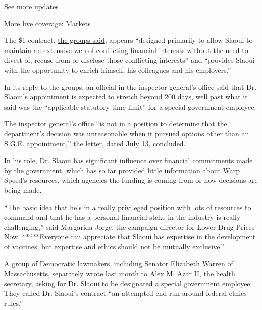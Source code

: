 \href{https://www.nytimes.com/2020/08/01/world/coronavirus-covid-19.html?action=click\&pgtype=Article\&state=default\&region=MAIN_CONTENT_1\&context=storylines_live_updates}{See
more updates}

More live coverage:
\href{https://www.nytimes.com/live/2020/07/31/business/stock-market-today-coronavirus?action=click\&pgtype=Article\&state=default\&region=MAIN_CONTENT_1\&context=storylines_live_updates}{Markets}

The \$1 contract,
\href{https://www.citizen.org/article/covid-19-vaccine-czar-moncef-slaoui-should-be-classified-as-a-special-government-employee/}{the
groups said}, appears ``designed primarily to allow Slaoui to maintain
an extensive web of conflicting financial interests without the need to
divest of, recuse from or disclose those conflicting interests'' and
``provides Slaoui with the opportunity to enrich himself, his colleagues
and his employers.''

In its reply to the groups, an official in the inspector general's
office said that Dr. Slaoui's appointment is expected to stretch beyond
200 days, well past what it said was the ``applicable statutory time
limit'' for a special government employee.

The inspector general's office ``is not in a position to determine that
the department's decision was unreasonable when it pursued options other
than an S.G.E. appointment,'' the letter, dated July 13, concluded.

In his role, Dr. Slaoui has significant influence over financial
commitments made by the government, which
\href{https://www.nytimes.com/2020/07/07/health/novavax-coronavirus-vaccine-warp-speed.html}{has
so far provided little information} about Warp Speed's resources, which
agencies the funding is coming from or how decisions are being made.

``The basic idea that he's in a really privileged position with lots of
resources to command and that he has a personal financial stake in the
industry is really challenging,'' said Margarida Jorge, the campaign
director for Lower Drug Prices Now. **``**Everyone can appreciate that
Slaoui has expertise in the development of vaccines, but expertise and
ethics should not be mutually exclusive.''

A group of Democratic lawmakers, including Senator Elizabeth Warren of
Massachusetts, separately
\href{https://www.warren.senate.gov/imo/media/doc/2020.06.15\%20Letter\%20about\%20Operation\%20Warp\%20Speed\%20conflicted\%20adviser\%20arrangement.pdf}{wrote}
last month to Alex M. Azar II, the health secretary, asking for Dr.
Slaoui to be designated a special government employee. They called Dr.
Slaoui's contract ``an attempted end-run around federal ethics rules.''

